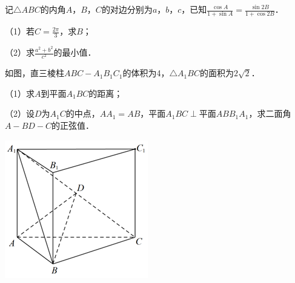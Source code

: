 \documentclass[fontset=founder]{ucedubook}
\begin{document}
\begin{ti}[.5]
记$\triangle ABC$的内角$A$，$B$，$C$的对边分别为$a$，$b$，$c$，已知$\frac{\cos A}{1 + \sin A} = \frac{\sin 2B}{1 + \cos 2B}$．

（1）若$C = \frac{2\pi}{3}$，求$B$；

（2）求$\frac{a^{2} + b^{2}}{c^{2}}$的最小值．
\end{ti}


\begin{ti}[.5]
如图，直三棱柱$ABC - A_{1}B_{1}C_{1}$的体积为4，$\triangle A_{1}BC$的面积为$2\sqrt{2}$．

（1）求$A$到平面$A_{1}BC$的距离；

（2）设$D$为$A_{1}C$的中点，$AA_{1} = AB$，平面$A_{1}BC\perp$平面$ABB_{1}A_{1}$，求二面角$A - BD - C$的正弦值．

\hfill\includegraphics[]{新高考I-19.png}
\end{ti}

\newpageb
\end{document}
